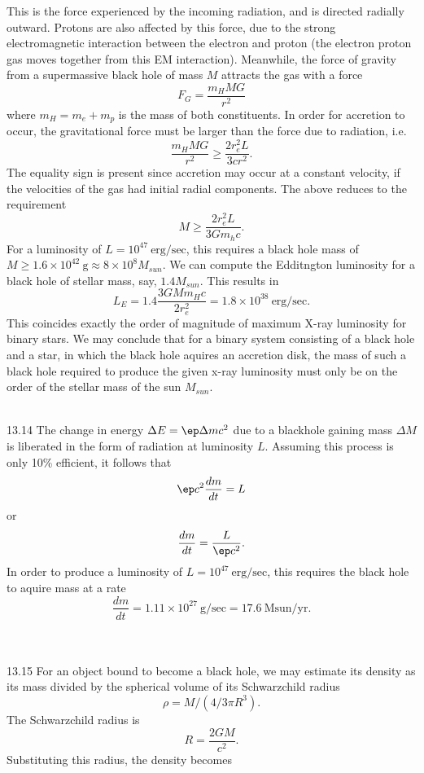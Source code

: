 \documentclass[10pt,letterpaper]{article}
\begin{document}
This is the force experienced by the incoming radiation, and is directed radially outward. Protons are also affected by this force, due to the strong electromagnetic interaction between the electron and proton (the electron proton gas moves together from this EM interaction). Meanwhile, the force of gravity from a supermassive black hole of mass $M$ attracts the gas with a force
\[
	F_G = \frac{m_H M G}{r^2}
\]
where $m_H = m_e+m_p$ is the mass of both constituents. In order for accretion to occur, the gravitational force must be larger than the force due to radiation, i.e.
\[
	\frac{m_H M G}{r^2} \ge  \frac{ 2r_e^2 L}{3cr^2}.
\]
The equality sign is present since accretion may occur at a constant velocity, if the velocities of the gas had initial radial components. The above reduces to the requirement
\[
	M \ge \frac{2 r_e^2 L}{3 Gm_h c}.
\]
For a luminosity of $L = 10^{47}\ \text{erg/sec}$, this requires a black hole mass of $M \ge 1.6\times 10^{42}\ \text{g}\approx 8\times 10^8 M_{sun} $. We can compute the Edditngton luminosity for a black hole of stellar mass, say, $1.4 M_{sun}$. This results in
\[
	L_E = 1.4\frac{3GM m_H c}{2r_e^2} =  1.8\times 10^{38}\ \text{erg/sec}.
\]
This coincides exactly the order of magnitude of maximum X-ray luminosity for binary stars. We may conclude that for a binary system consisting of a black hole and a star, in which the black hole aquires an accretion disk, the mass of such a black hole required to produce the given x-ray luminosity must only be on the order of the stellar mass of the sun $M_{sun}$. 
\\ \\
\item[13.14]
The change in energy $\Delta E = \ep \Delta m c^2$ due to a blackhole gaining mass $\Delta M$ is liberated in the form of radiation at luminosity $L$. Assuming this process is only 10\% efficient, it follows that 
\[
	\ep c^2 \frac{dm}{dt} = L
\]
or
\[	
	\frac{dm}{dt} = \frac{L}{\ep c^2}.
\]
In order to produce a luminosity of $L = 10^{47}\ \text{erg/sec}$, this requires the black hole to aquire mass at a rate
\[
	\frac{dm}{dt} = 1.11\times 10^{27}\ \text{g/sec} = 17.6\ \text{Msun/yr}. 
\]
\\ \\
\item[13.15]
For an object bound to become a black hole, we may estimate its density as its mass divided by the spherical volume of its Schwarzchild radius
\[
	\rho = M/(4/3\pi R^3).
\]
The Schwarzchild radius is
\[
	R = \frac{2GM}{c^2}.
\]
Substituting this radius, the density becomes
\end{document}
